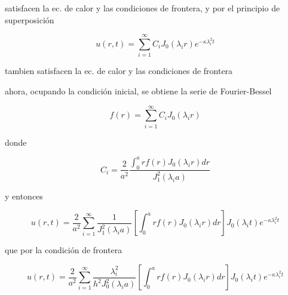 \documentclass[12pt,a4paper]{article}
\begin{document}
\begin{enumerate}
   satisfacen la ec. de calor y las condiciones de frontera, y por el principio de superposición
   
   \begin{equation*}
       u(r,t)= \sum_{i=1}^{\infty}C_i J_0(\lambda_i r) e^{-\kappa \lambda_{i}^{2}t}
   \end{equation*}
   
   tambien satisfacen la ec. de calor y las condiciones de frontera
   
   ahora, ocupando la condición inicial, se obtiene la serie de Fourier-Bessel
   
   \begin{equation*}
       f(r)= \sum_{i=1}^{\infty}C_i J_0(\lambda_i r)
   \end{equation*}
   
   donde 
   
   \begin{equation*}
       C_i = \frac{2}{a^2} \frac{\int_{0}^{a} rf(r)J_0(\lambda_i r) dr}{J_1^2 (\lambda_i a)}
   \end{equation*}
   
   y entonces
   
   \begin{equation*}
       u(r,t)=\frac{2}{a^2} \sum_{i=1}^{\infty}\frac{1}{J_1^{2}(\lambda_i a)}\left[\int_{0}^{a} rf(r)J_0(\lambda_i r) dr\right] J_0(\lambda_i t) e^{-\kappa \lambda_{i}^{2}t}
   \end{equation*}
   
   que por la condición de frontera
  
   
   \begin{equation*}
       u(r,t)=\frac{2}{a^2} \sum_{i=1}^{\infty}\frac{\lambda_i^2}{h^2J_0^{2}(\lambda_i a)}\left[\int_{0}^{a} rf(r)J_0(\lambda_i r) dr\right] J_0(\lambda_i t) e^{-\kappa \lambda_{i}^{2}t}
   \end{equation*}
   
   


\end{enumerate}
\end{document}
